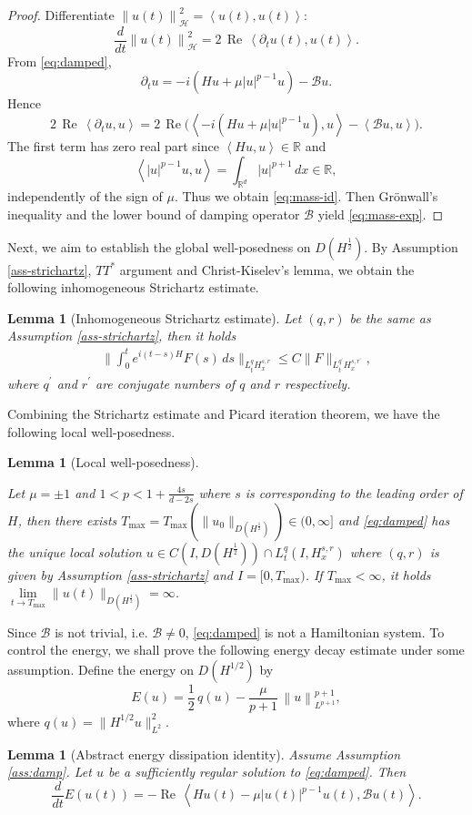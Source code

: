 \documentclass[10pt%
]{amsart}
\numberwithin{equation}{section}
\newcommand{\norm}[1]{\left\|#1\right\|}
\newcommand{\Ree}{\operatorname{Re}}
\newcommand{\R}{\mathbb{R}}
\newcommand{\ip}[2]{\left\langle #1,#2\right\rangle}
\newtheorem{lemma}[theorem]{Lemma}
\theoremstyle{definition}
\begin{document}
\begin{proof}
	Differentiate $\norm{u(t)}_{\mathcal H}^2=\ip{u(t)}{u(t)}$:
	\[
	\frac{d}{dt}\norm{u(t)}_{\mathcal H}^2
	= 2\,\Ree\,\ip{\partial_t u(t)}{u(t)}.
	\]
	From \eqref{eq:damped},
	\[
	\partial_t u = -i(Hu+\mu |u|^{p-1}u) - \mathcal  Bu.
	\]
	Hence
	\[
	2\,\Ree\,\ip{\partial_t u}{u}
	=2\,\Ree\Big(\ip{-i(Hu+\mu |u|^{p-1}u)}{u}-\ip{\mathcal Bu}{u}\Big).
	\]
	The first term has zero real part since $\ip{Hu}{u}\in\mathbb R$  and
	\[
	\ip{|u|^{p-1}u}{u}=\int_{\R^d} |u|^{p+1}\,dx \in \mathbb R,
	\]
	independently of the sign of $\mu$.
	Thus we obtain \eqref{eq:mass-id}.
	Then Gr\"onwall's inequality and the lower bound of damping operator $\mathcal{B}$ yield \eqref{eq:mass-exp}.
\end{proof}

Next, we aim to establish the global well-posedness on $D(H^\frac{1}{2})$. By Assumption \ref{ass-strichartz}, $TT^*$ argument and Christ-Kiselev's lemma, we obtain the following inhomogeneous Strichartz estimate.
\begin{lemma}[Inhomogeneous Strichartz estimate] Let $(q,r)$ be the same as Assumption \ref{ass-strichartz}, then it holds
	\begin{align*}
		\Big\|\int_0^te^{i(t-s)H}F(s)\,ds\Big\|_{L_t^qH_x^{s,r}}\leq C\|F\|_{L_{t}^{q^\prime}H_x^{s,r^\prime}},
	\end{align*}
	where $q^\prime$ and $r^\prime$ are conjugate numbers of $q$ and $r$ respectively.
\end{lemma}
Combining the Strichartz estimate and Picard iteration theorem, we have the following local well-posedness.
\begin{lemma}[Local well-posedness]\label{LWP}
	
	Let $\mu=\pm1$ and $1<p<1+\frac{4s}{d-2s}$ where $s$ is corresponding to the leading order of $H$, then there exists $T_{\operatorname{max}}=T_{\operatorname{max}}(\|u_0\|_{D(H^\frac{1}{2})})\in(0,\infty]$ and \eqref{eq:damped} has the unique local solution $u\in C(I,D(H^\frac{1}{2}))\cap L_t^{q}(I,H_x^{s,r})$ where $(q,r)$ is given by Assumption \ref{ass-strichartz} and $I=[0,T_{\operatorname{max}})$. If    $T_{\operatorname{max}}<\infty$, it holds $\lim\limits_{t\to T_{\operatorname{max}}}\|u(t)\|_{D(H^\frac{1}{2})}=\infty$.
\end{lemma}
Since $\mathcal{B}$ is not trivial, i.e. $\mathcal{B}\neq0$, \eqref{eq:damped} is not a Hamiltonian system. To control the energy, we shall prove the following energy decay estimate under some assumption. 
Define the energy on $D(H^{1/2})$ by
\begin{equation}\label{eq:energy}
	E(u)
	=
	\frac12\,q(u)
	-
	\frac{\mu}{p+1}\,\norm{u}_{L^{p+1}}^{p+1},
\end{equation}
where $q(u)=\|H^{1/2}u\|_{L^2}^2$. 
\begin{lemma}[Abstract energy dissipation identity]
	Assume Assumption \ref{ass:damp}. Let $u$ be a sufficiently regular solution to \eqref{eq:damped}. Then
	\begin{equation}\label{eq:energy-dissipation}
		\frac{d}{dt}E(u(t))
		=
		-\Ree\,\ip{Hu(t)-\mu |u(t)|^{p-1}u(t)}{\mathcal B u(t)}.
	\end{equation}
\end{lemma}
\end{document}
